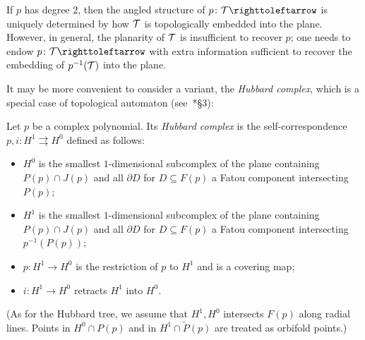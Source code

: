 \documentclass{amsart}
\begin{document}
\begin{rem}
  If $p$ has degree $2$, then the angled structure of
  $p\colon\HT\selfmap$ is uniquely determined by how ${\mathcal T}$ is
  topologically embedded into the plane. However, in general, the
  planarity of ${\mathcal T}$ is insufficient to recover $p$; one needs to
  endow $p \colon\HT\selfmap$ with extra information sufficient to
  recover the embedding of $p^{-1}({\mathcal T})$ into the plane.
\end{rem}

It may be more convenient to consider a variant, the \emph{Hubbard
  complex}, which is a special case of topological automaton
(see~\cite{nekrashevych:combinatorialmodels}*{\S3}):

\begin{defn}
  Let $p$ be a complex polynomial. Its \emph{Hubbard complex} is the
  self-correspondence $p,i\colon H^1\rightrightarrows H^0$ defined as
  follows:
  \begin{itemize}
  \item $H^0$ is the smallest $1$-dimensional subcomplex of the plane
    containing $P(p)\cap J(p)$ and all $\partial D$ for $D\subseteq F(p)$ a
    Fatou component intersecting $P(p)$;
  \item $H^1$ is the smallest $1$-dimensional subcomplex of the plane
    containing $P(p)\cap J(p)$ and all $\partial D$ for $D\subseteq F(p)$ a
    Fatou component intersecting $p^{-1}(P(p))$;
  \item $p\colon H^1\to H^0$ is the restriction of $p$ to $H^1$ and is a
    covering map;
  \item $i\colon H^1\to H^0$ retracts $H^1$ into $H^0$.\qedhere
  \end{itemize}
\end{defn}
\noindent (As for the Hubbard tree, we assume that $H^1, H^0$ intersects
$F(p)$ along radial lines. Points in $H^{0}\cap P(p)$ and in $H^{1}\cap \widetilde P(p)$ are treated as orbifold points.)
\end{document}
